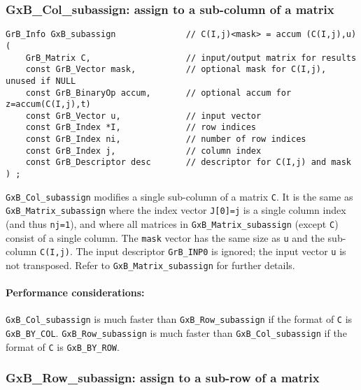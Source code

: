 \documentclass[12pt]{article}
\begin{document}
\newpage
\subsubsection{{\sf GxB\_Col\_subassign:} assign to a sub-column of a matrix}
\label{subassign_column}

\begin{mdframed}[userdefinedwidth=6in]
{\footnotesize
\begin{verbatim}
GrB_Info GxB_subassign              // C(I,j)<mask> = accum (C(I,j),u)
(
    GrB_Matrix C,                   // input/output matrix for results
    const GrB_Vector mask,          // optional mask for C(I,j), unused if NULL
    const GrB_BinaryOp accum,       // optional accum for z=accum(C(I,j),t)
    const GrB_Vector u,             // input vector
    const GrB_Index *I,             // row indices
    const GrB_Index ni,             // number of row indices
    const GrB_Index j,              // column index
    const GrB_Descriptor desc       // descriptor for C(I,j) and mask
) ;
\end{verbatim} } \end{mdframed}

\verb'GxB_Col_subassign' modifies a single sub-column of a matrix \verb'C'.  It
is the same as \verb'GxB_Matrix_subassign' where the index vector \verb'J[0]=j'
is a single column index (and thus \verb'nj=1'), and where all matrices in
\verb'GxB_Matrix_subassign' (except \verb'C') consist of a single column.  The
\verb'mask' vector has the same size as \verb'u' and the sub-column
\verb'C(I,j)'.  The input descriptor \verb'GrB_INP0' is ignored; the input
vector \verb'u' is not transposed.  Refer to \verb'GxB_Matrix_subassign' for
further details.

\paragraph{\bf Performance considerations:} %
\verb'GxB_Col_subassign' is much faster than \verb'GxB_Row_subassign' if the
format of \verb'C' is \verb'GxB_BY_COL'.  \verb'GxB_Row_subassign' is much
faster than \verb'GxB_Col_subassign' if the format of \verb'C' is
\verb'GxB_BY_ROW'.

\subsubsection{{\sf GxB\_Row\_subassign:} assign to a sub-row of a matrix}
\label{subassign_row}
\end{document}
